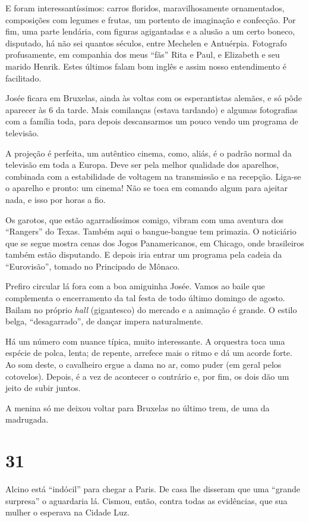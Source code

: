 E foram interessantíssimos: carros floridos, maravilhosamente ornamentados, composições com legumes e frutas, um portento de imaginação e confecção. Por fim, uma parte lendária, com figuras agigantadas e a alusão a um certo boneco, disputado, há não sei quantos séculos, entre Mechelen e Antuérpia. Fotografo profusamente, em companhia dos meus ``fãs'' Rita e Paul, e Elizabeth e seu marido Henrik. Estes últimos falam bom inglês e assim nosso entendimento é facilitado.

Josée ficara em Bruxelas, ainda às voltas com os esperantistas alemães, e só pôde aparecer às 6 da tarde. Mais comilanças (estava tardando) e algumas fotografias com a família toda, para depois descansarmos um pouco vendo um programa de televisão.

A projeção é perfeita, um autêntico cinema, como, aliás, é o padrão normal da televisão em toda a Europa. Deve ser pela melhor qualidade dos aparelhos, combinada com a estabilidade de voltagem na transmissão e na recepção. Liga-se o aparelho e pronto: um cinema! Não se toca em comando algum para ajeitar nada, e isso por horas a fio.

Os garotos, que estão agarradíssimos comigo, vibram com uma aventura dos ``Rangers'' do Texas. Também aqui o bangue-bangue tem primazia. O noticiário que se segue mostra cenas dos Jogos Panamericanos, em Chicago, onde brasileiros também estão disputando. E depois iria entrar um programa pela cadeia da ``Eurovisão'', tomado no Principado de Mônaco.

Prefiro circular lá fora com a boa amiguinha Josée. Vamos ao baile que complementa o encerramento da tal festa de todo último domingo de agosto. Bailam no próprio \textit{hall} (gigantesco) do mercado e a animação é grande. O estilo belga, ``desagarrado'', de dançar impera naturalmente.

Há um número com nuance típica, muito interessante. A orquestra toca uma espécie de polca, lenta; de repente, arrefece mais o ritmo e dá um acorde forte. Ao som deste, o cavalheiro ergue a dama no ar, como puder (em geral pelos cotovelos). Depois, é a vez de acontecer o contrário e, por fim, os dois dão um jeito de subir juntos.

A menina só me deixou voltar para Bruxelas no último trem, de uma da madrugada.

\section*{31 \adfflatleafright {}}
Alcino está ``indócil'' para chegar a Paris. De casa lhe disseram que uma ``grande surpresa'' o aguardaria lá. Cismou, então, contra todas as evidências, que sua mulher o esperava na Cidade Luz.

